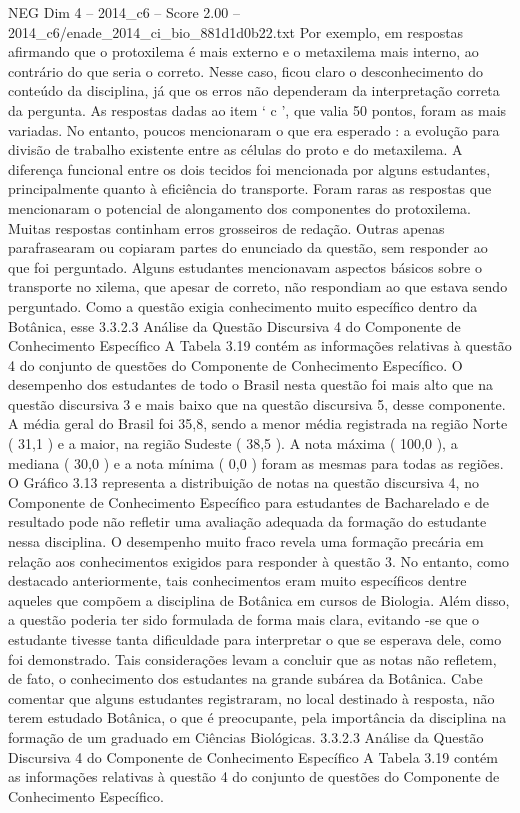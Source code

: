\begin{textsample}{NEG Dim 4 – 2014\_c6 – Score 2.00 – 2014\_c6/enade\_2014\_ci\_bio\_881d1d0b22.txt}
Por exemplo, em respostas afirmando que o protoxilema é mais externo e o metaxilema mais interno, ao contrário do que seria o correto.
Nesse caso, ficou claro o desconhecimento do conteúdo da disciplina, já que os erros não dependeram da interpretação correta da pergunta.
As respostas dadas ao item ‘ c ’, que valia 50 pontos, foram as mais variadas.
No entanto, poucos mencionaram o que era esperado : a evolução para divisão de trabalho existente entre as células do proto e do metaxilema.
A diferença funcional entre os dois tecidos foi mencionada por alguns estudantes, principalmente quanto à eficiência do transporte.
Foram raras as respostas que mencionaram o potencial de alongamento dos componentes do protoxilema.
Muitas respostas continham erros grosseiros de redação.
Outras apenas parafrasearam ou copiaram partes do enunciado da questão, sem responder ao que foi perguntado.
Alguns estudantes mencionavam aspectos básicos sobre o transporte no xilema, que apesar de correto, não respondiam ao que estava sendo perguntado.
Como a questão exigia conhecimento muito específico dentro da Botânica, esse 3.3.2.3 Análise da Questão Discursiva 4 do Componente de Conhecimento Específico A Tabela 3.19 contém as informações relativas à questão 4 do conjunto de questões do Componente de Conhecimento Específico.
O desempenho dos estudantes de todo o Brasil nesta questão foi mais alto que na questão discursiva 3 e mais baixo que na questão discursiva 5, desse componente.
A média geral do Brasil foi 35,8, sendo a menor média registrada na região Norte ( 31,1 ) e a maior, na região Sudeste ( 38,5 ).
A nota máxima ( 100,0 ), a mediana ( 30,0 ) e a nota mínima ( 0,0 ) foram as mesmas para todas as regiões.
O Gráfico 3.13 representa a distribuição de notas na questão discursiva 4, no Componente de Conhecimento Específico para estudantes de Bacharelado e de resultado pode não refletir uma avaliação adequada da formação do estudante nessa disciplina.
O desempenho muito fraco revela uma formação precária em relação aos conhecimentos exigidos para responder à questão 3.
No entanto, como destacado anteriormente, tais conhecimentos eram muito específicos dentre aqueles que compõem a disciplina de Botânica em cursos de Biologia.
Além disso, a questão poderia ter sido formulada de forma mais clara, evitando -se que o estudante tivesse tanta dificuldade para interpretar o que se esperava dele, como foi demonstrado.
Tais considerações levam a concluir que as notas não refletem, de fato, o conhecimento dos estudantes na grande subárea da Botânica.
Cabe comentar que alguns estudantes registraram, no local destinado à resposta, não terem estudado Botânica, o que é preocupante, pela importância da disciplina na formação de um graduado em Ciências Biológicas. 3.3.2.3 Análise da Questão Discursiva 4 do Componente de Conhecimento Específico A Tabela 3.19 contém as informações relativas à questão 4 do conjunto de questões do Componente de Conhecimento Específico.

\end{textsample}
